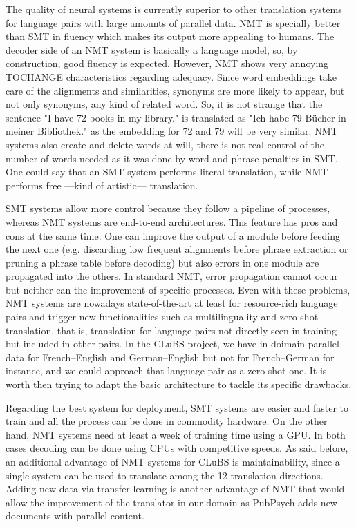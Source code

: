 \documentclass[a4paper,11pt]{article}
\begin{document}
The quality of neural systems is currently superior to other translation systems for language pairs with large amounts of parallel data.
NMT is specially better than SMT in fluency which makes its output more appealing to humans. The decoder side of an NMT system is basically a language model, so, by construction, good fluency is expected. However, NMT shows very annoying TOCHANGE characteristics regarding adequacy. Since word embeddings take care of the alignments and similarities, synonyms are more likely to appear, but not only synonyms, any kind of related word. So, it is not strange that the sentence "I have 72 books in my library." is translated as "Ich habe 79 Bücher in meiner Bibliothek." as the embedding for 72 and 79 will be very similar. NMT systems also create and delete words at will, there is not real control of the number of words needed as it was done by word and phrase penalties in SMT. One could say that an SMT system performs literal translation, while NMT performs free ---kind of artistic--- translation.

SMT systems allow more control because they follow a pipeline of processes, whereas NMT systems are end-to-end architectures. This feature has pros and cons at the same time. One can improve the output of a module before feeding the next one (e.g. discarding low frequent alignments before phrase extraction or pruning a phrase table before decoding) but also errors in one module are propagated into the others. In standard NMT, error propagation cannot occur but neither can the improvement of specific processes. Even with these problems, NMT systems are nowadays state-of-the-art at least for resource-rich language pairs and trigger new functionalities such as multilinguality and zero-shot translation, that is, translation for language pairs not directly seen in training but included in other pairs. In the CLuBS project, we have in-doimain parallel data for French--English and German--English but not for French--German for instance, and we could approach that language pair as a zero-shot one. It is worth then trying to adapt the basic architecture to tackle its specific drawbacks.

Regarding the best system for deployment, SMT systems are easier and faster to train and all the process can be done in commodity hardware. On the other hand, NMT systems need at least a week of training time using a GPU. In both cases decoding can be done using CPUs with competitive speeds. As said before, an additional advantage of NMT systems for CLuBS is maintainability, since a single system can be used to translate among the 12 translation directions. Adding new data via transfer learning is another advantage of NMT that would allow the improvement of the translator in our domain as PubPsych adds new documents with parallel content.
\end{document}
